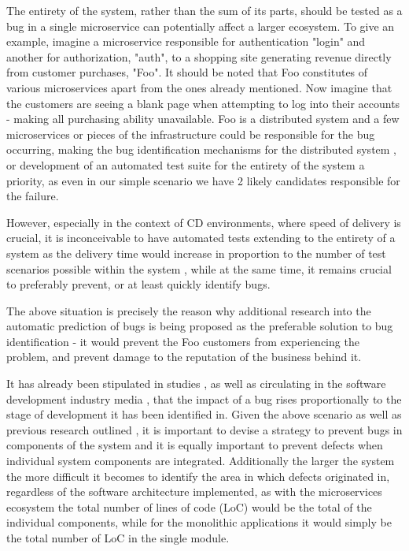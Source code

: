 The entirety of the system, rather than the sum of its parts, should be tested as a bug in a single microservice can potentially affect a larger ecosystem. To give an example, imagine a microservice responsible for authentication "login" and another for authorization, "auth", to a shopping site generating revenue directly from customer purchases, "Foo". It should be noted that Foo constitutes of various microservices apart from the ones already mentioned. Now imagine that the customers are seeing a blank page when attempting to log into their accounts - making all purchasing ability unavailable. Foo is a distributed system and a few microservices or pieces of the infrastructure could be responsible for the bug occurring, making the bug identification mechanisms for the distributed system , or development of an automated test suite for the entirety of the system a priority, as even in our simple scenario we have 2 likely candidates responsible for the failure. 

However, especially in the context of CD environments, where speed of delivery is crucial, it is inconceivable to have automated tests extending to the entirety of a system as the delivery time would increase in proportion to the number of test scenarios possible within the system \cite{softwareTestingChallenges}, while at the same time, it remains crucial to preferably prevent, or at least quickly identify bugs. 

The above situation is precisely the reason why additional research into the automatic prediction of bugs is being proposed as the preferable solution to bug identification - it would prevent the Foo customers from experiencing the problem, and prevent damage to the reputation of the business behind it.

It has already been stipulated in studies \cite{autoDetectionOfPerfBugs}, as well as circulating in the software development industry media \cite{costOfBugInRelationToDevelopmentPhase}, that the impact of a bug rises proportionally to the stage of development it has been identified in.
Given the above scenario as well as previous research outlined \cite{bugDetectionInParticleSwarm}, it is important to devise a strategy to prevent bugs in components of the system and it is equally important to prevent defects when individual system components are integrated. Additionally the larger the system the more difficult it becomes to identify the area in which defects originated in\cite{Zhou_2012_whereShouldBugsBeFixed}, regardless of the software architecture implemented, as with the microservices ecosystem the total number of lines of code (LoC) would be the total of the individual components, while for the monolithic applications it would simply be the total number of LoC in the single module. 

